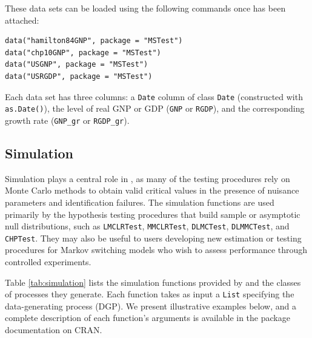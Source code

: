 These data sets can be loaded using the following commands once  has been attached:

\begin{verbatim}
data("hamilton84GNP", package = "MSTest")
data("chp10GNP", package = "MSTest")
data("USGNP", package = "MSTest")
data("USRGDP", package = "MSTest")
\end{verbatim}

Each data set has three columns: a \texttt{Date} column of class \texttt{Date} (constructed with \texttt{as.Date()}), the level of real GNP or GDP (\texttt{GNP} or \texttt{RGDP}), and the corresponding growth rate (\texttt{GNP\_gr} or \texttt{RGDP\_gr}).

\subsection{Simulation}\label{simulation}

Simulation plays a central role in , as many of the testing procedures rely on Monte Carlo methods to obtain valid critical values in the presence of nuisance parameters and identification failures. The simulation functions are used primarily by the hypothesis testing procedures that build sample or asymptotic null distributions, such as \texttt{LMCLRTest}, \texttt{MMCLRTest}, \texttt{DLMCTest}, \texttt{DLMMCTest}, and \texttt{CHPTest}. They may also be useful to users developing new estimation or testing procedures for Markov switching models who wish to assess performance through controlled experiments.

Table \ref{tab:simulation} lists the simulation functions provided by  and the classes of processes they generate. Each function takes as input a \texttt{List} specifying the data-generating process (DGP). We present illustrative examples below, and a complete description of each function's arguments is available in the package documentation on CRAN.


